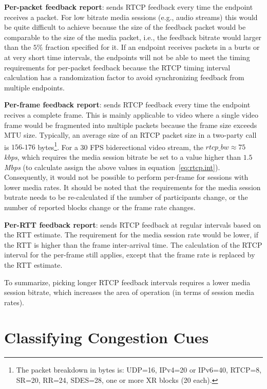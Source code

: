 \textbf{Per-packet feedback report}: sends RTCP feedback every time the
endpoint receives a packet. For low bitrate media sessions (e.g., audio
streams) this would be quite difficult to achieve because the size of the
feedback packet would be comparable to the size of the media packet, i.e., the
feedback bitrate would larger than the $5\%$ fraction specified for it. If an
endpoint receives packets in a burts or at very short time intervals, the
endpoints will not be able to meet the timing requirements for per-packet
feedback because the RTCP timing interval calculation has a randomization
factor to avoid synchronizing feedback from multiple endpoints.

\textbf{Per-frame feedback report}: sends RTCP feedback every time the
endpoint recives a complete frame. This is mainly applicable to video where a
single video frame would be fragmented into multiple packets because the frame
size exceeds MTU size. Typically, an average size of an RTCP packet size in a
two-party call is $156$-$176$ bytes\footnote{The packet breakdown in bytes is:
UDP=16, IPv4=20 or IPv6=40, RTCP=8, SR=20, RR=24, SDES=28, one or more XR
blocks (20 each).}. For a 30 FPS biderectional video stream, the $rtcp\_bw
\approx 75$ \emph{kbps}, which requires the media session bitrate be set to a
value higher than $1.5$ \emph{Mbps} (to calculate assign the above values in
equation~\ref{eq:rtcp.int}). Consequently, it would not be possible to perform
per-frame for sessions with lower media rates. It should be noted that the
requirements for the media session butrate needs to be re-calculated if the
number of participants change, or the number of reported blocks change or the
frame rate changes.

\textbf{Per-RTT feedback report}: sends RTCP feedback at regular intervals
based on the RTT estimate. The requirement for the media session rate would be
lower, if the RTT is higher than the frame inter-arrival time. The calculation
of the RTCP interval for the per-frame still applies, except that the frame
rate is replaced by the RTT estimate.

To summarize, picking longer RTCP feedback intervals requires a lower media
session bitrate, which increases the area of operation (in terms of session
media rates).

\section{Classifying Congestion Cues}
\label{fw.fw}

